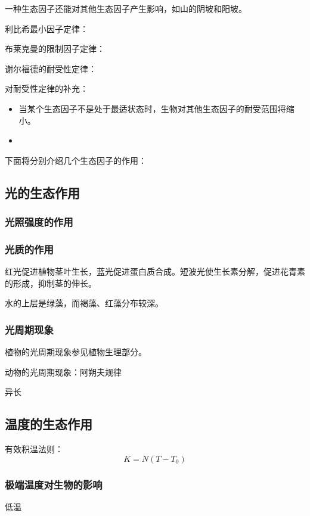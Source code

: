 	一种生态因子还能对其他生态因子产生影响，如山的阴坡和阳坡。
	
	利比希最小因子定律：
	
	布莱克曼的限制因子定律：
	
	谢尔福德的耐受性定律：
	
	对耐受性定律的补充：
	
	\begin{itemize}
		\item 当某个生态因子不是处于最适状态时，生物对其他生态因子的耐受范围将缩小。
		\item 
	\end{itemize}
	
	下面将分别介绍几个生态因子的作用：
	
\subsection{光的生态作用}

\subsubsection{光照强度的作用}

\subsubsection{光质的作用}

红光促进植物茎叶生长，蓝光促进蛋白质合成。短波光使生长素分解，促进花青素的形成，抑制茎的伸长。

水的上层是绿藻，而褐藻、红藻分布较深。

\subsubsection{光周期现象}

植物的光周期现象参见植物生理部分。

动物的光周期现象：阿朔夫规律

异长
\subsection{温度的生态作用}

有效积温法则：\[K=N(T-T_0)\]

\subsubsection{极端温度对生物的影响}

低温

